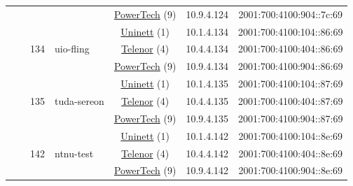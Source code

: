 \begin{small}
\begin{center}
\begin{longtable}{|c|c|c|c|c|c|c|c|}
  &  &  &  & \multicolumn{2}{|c|}{\tiny{\href{http://www.powertech.no}{PowerTech} (9)}} & \tiny{10.9.4.124} & \tiny{2001:700:4100:904::7c:69} \\* \cline{3-3}\cline{4-4}\cline{5-5}\cline{6-6}\cline{7-7}\cline{8-8}
  &  & \multirow{3}{*}{\tiny{134}} & \multicolumn{1}{|l|}{\multirow{3}{*}{\tiny{uio-fling}}} & \multicolumn{2}{|c|}{\tiny{\href{https://www.uninett.no}{Uninett} (1)}} & \tiny{10.1.4.134} & \tiny{2001:700:4100:104::86:69} \\* \cline{5-5}\cline{6-6}\cline{7-7}\cline{8-8}
  &  &  &  & \multicolumn{2}{|c|}{\tiny{\href{https://www.telenor.no}{Telenor} (4)}} & \tiny{10.4.4.134} & \tiny{2001:700:4100:404::86:69} \\* \cline{5-5}\cline{6-6}\cline{7-7}\cline{8-8}
  &  &  &  & \multicolumn{2}{|c|}{\tiny{\href{http://www.powertech.no}{PowerTech} (9)}} & \tiny{10.9.4.134} & \tiny{2001:700:4100:904::86:69} \\* \cline{3-3}\cline{4-4}\cline{5-5}\cline{6-6}\cline{7-7}\cline{8-8}
  &  & \multirow{3}{*}{\tiny{135}} & \multicolumn{1}{|l|}{\multirow{3}{*}{\tiny{tuda-sereon}}} & \multicolumn{2}{|c|}{\tiny{\href{https://www.uninett.no}{Uninett} (1)}} & \tiny{10.1.4.135} & \tiny{2001:700:4100:104::87:69} \\* \cline{5-5}\cline{6-6}\cline{7-7}\cline{8-8}
  &  &  &  & \multicolumn{2}{|c|}{\tiny{\href{https://www.telenor.no}{Telenor} (4)}} & \tiny{10.4.4.135} & \tiny{2001:700:4100:404::87:69} \\* \cline{5-5}\cline{6-6}\cline{7-7}\cline{8-8}
  &  &  &  & \multicolumn{2}{|c|}{\tiny{\href{http://www.powertech.no}{PowerTech} (9)}} & \tiny{10.9.4.135} & \tiny{2001:700:4100:904::87:69} \\* \cline{3-3}\cline{4-4}\cline{5-5}\cline{6-6}\cline{7-7}\cline{8-8}
  &  & \multirow{3}{*}{\tiny{142}} & \multicolumn{1}{|l|}{\multirow{3}{*}{\tiny{ntnu-test}}} & \multicolumn{2}{|c|}{\tiny{\href{https://www.uninett.no}{Uninett} (1)}} & \tiny{10.1.4.142} & \tiny{2001:700:4100:104::8e:69} \\* \cline{5-5}\cline{6-6}\cline{7-7}\cline{8-8}
  &  &  &  & \multicolumn{2}{|c|}{\tiny{\href{https://www.telenor.no}{Telenor} (4)}} & \tiny{10.4.4.142} & \tiny{2001:700:4100:404::8e:69} \\* \cline{5-5}\cline{6-6}\cline{7-7}\cline{8-8}
  &  &  &  & \multicolumn{2}{|c|}{\tiny{\href{http://www.powertech.no}{PowerTech} (9)}} & \tiny{10.9.4.142} & \tiny{2001:700:4100:904::8e:69} \\* \cline{3-3}\cline{4-4}\cline{5-5}\cline{6-6}\cline{7-7}\cline{8-8}

\end{longtable}
\end{center}
\end{small}
